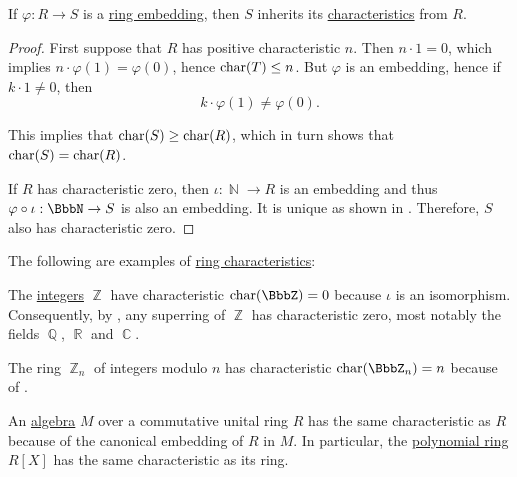 \begin{proposition}\label{thm:ring_embedding_preserves_characteristic}
  If \( \varphi: R \to S \) is a \hyperref[def:ring/homomorphism]{ring embedding}, then \( S \) inherits its \hyperref[def:ring_characteristic]{characteristics} from \( R \).
\end{proposition}
\begin{proof}
  First suppose that \( R \) has positive characteristic \( n \). Then \( n \cdot 1 = 0 \), which implies \( n \cdot \varphi(1) = \varphi(0) \), hence \( \op{char}(T) \leq n \). But \( \varphi \) is an embedding, hence if \( k \cdot 1 \neq 0 \), then
  \begin{equation*}
    k \cdot \varphi(1) \neq \varphi(0).
  \end{equation*}

  This implies that \( \op{char}(S) \geq \op{char}(R) \), which in turn shows that \( \op{char}(S) = \op{char}(R) \).

  If \( R \) has characteristic zero, then \( \iota: \BbbN \to R \) is an embedding and thus \( \varphi \bincirc \iota: \BbbN \to S \) is also an embedding. It is unique as shown in . Therefore, \( S \) also has characteristic zero.
\end{proof}

\begin{example}\label{ex:def:ring_characteristic}
  The following are examples of \hyperref[def:ring_characteristic]{ring characteristics}:
  \begin{thmenum}
     The \hyperref[def:integers]{integers} \( \BbbZ \) have characteristic \( \op{char}(\BbbZ) = 0 \) because \( \iota \) is an isomorphism. Consequently, by , any superring of \( \BbbZ \) has characteristic zero, most notably the fields \( \BbbQ \), \( \BbbR \) and \( \BbbC \).

     The ring \hyperref[def:ring_of_integers_modulo]{\( \BbbZ_n \)} of integers modulo \( n \) has characteristic \( \op{char}(\BbbZ_n) = n \) because of .

     An \hyperref[def:algebra_over_semiring]{algebra} \( M \) over a commutative unital ring \( R \) has the same characteristic as \( R \) because of the canonical embedding of \( R \) in \( M \). In particular, the \hyperref[def:polynomial_algebra]{polynomial ring} \( R[X] \) has the same characteristic as its ring.
  \end{thmenum}
\end{example}

